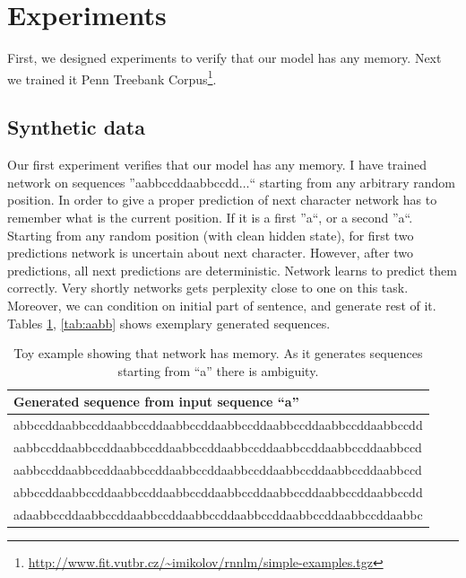 \documentclass{article}
\begin{document}
\section{Experiments}\label{sec:experiments}
First, we designed experiments to verify that our model has any memory. 
Next we trained it Penn Treebank Corpus\footnote{\url{http://www.fit.vutbr.cz/~imikolov/rnnlm/simple-examples.tgz}}.  


\subsection{Synthetic data}
Our first experiment verifies that our model has any memory. I have trained network on sequences ''aabbccddaabbccdd$\dots$`` starting
from any arbitrary random position. In order to give a proper prediction of next character network has to remember what
is the current position. If it is a first ''a``, or a second ''a``. Starting from any random position (with clean hidden state), for first two predictions
network is uncertain about next character. However, after two predictions, all next predictions are deterministic. Network
learns to predict them correctly. Very shortly networks gets perplexity close to one on this task. Moreover, we can condition
on initial part of sentence, and generate rest of it. Tables \ref{tab:a}, \ref{tab:aabb} shows exemplary generated sequences.


\begin{table}[t]
\tiny
\centering
\begin{tabular}{l}
\hline
Generated sequence from input sequence ``a'' \\
\hline
 abbccddaabbccddaabbccddaabbccddaabbccddaabbccddaabbccddaabbccdd\\
 aabbccddaabbccddaabbccddaabbccddaabbccddaabbccddaabbccddaabbccd\\
 aabbccddaabbccddaabbccddaabbccddaabbccddaabbccddaabbccddaabbccd\\
 abbccddaabbccddaabbccddaabbccddaabbccddaabbccddaabbccddaabbccdd\\
 adaabbccddaabbccddaabbccddaabbccddaabbccddaabbccddaabbccddaabbc\\
\hline
\end{tabular}
\caption{Toy example showing that network has memory. As it generates sequences starting from ``a'' there is 
        ambiguity.}
        \label{tab:a}
\end{table}
\end{document}
